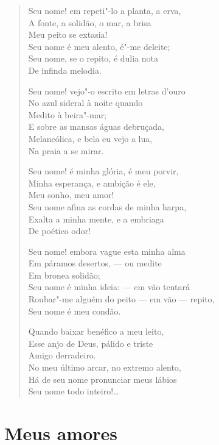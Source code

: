 \begin{verse}
Seu nome! em repeti"-lo a planta, a erva,\\
A fonte, a solidão, o mar, a brisa\\
Meu peito se extasia!\\
Seu nome é meu alento, é"-me deleite;\\
Seu nome, se o repito, é dulia nota\\
De infinda melodia.

Seu nome! vejo"-o escrito em letras d'ouro\\
No azul sideral à noite quando\\
Medito à beira"-mar;\\
E sobre as mansas águas debruçada,\\
Melancólica, e bela eu vejo a lua,\\
Na praia a se mirar.

Seu nome! é minha glória, é meu porvir,\\
Minha esperança, e ambição é ele,\\
Meu sonho, meu amor!\\
Seu nome afina as cordas de minha harpa,\\
Exalta a minha mente, e a embriaga\\
De poético odor!

Seu nome! embora vague esta minha alma\\
Em páramos desertos, --- ou medite\\
Em bronea solidão;\\
Seu nome é minha ideia: --- em vão tentará\\
Roubar"-me alguém do peito --- em vão --- repito,\\
Seu nome é meu condão.

Quando baixar benéfico a meu leito,\\
Esse anjo de Deus, pálido e triste\\
Amigo derradeiro.\\
No meu último arcar, no extremo alento,\\
Há de seu nome pronunciar meus lábios\\
Seu nome todo inteiro!\ldots{}
\end{verse}

\chapter{Meus amores}

